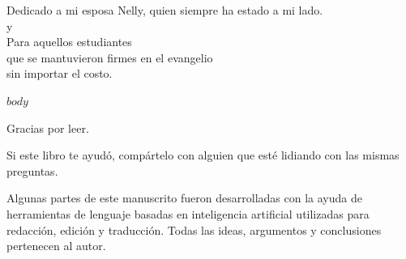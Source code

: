 \documentclass[11.5pt,twoside]{book}
\begin{document}
\vspace*{4cm}

\begin{center}

Dedicado a mi esposa Nelly,
quien siempre ha estado a mi lado.\\

y\\

Para aquellos estudiantes \\
que se mantuvieron firmes en el evangelio\\
sin importar el costo.
\end{center}

\clearpage

\renewcommand{\contentsname}{Índice}
\tableofcontents

\clearpage

$body$

\clearpage
\thispagestyle{empty}

\vspace*{4cm}

\begin{center}

Gracias por leer.

\vspace{1cm}

Si este libro te ayudó, compártelo 
con alguien que esté lidiando con las mismas preguntas.\\

\vspace{1cm}

{\footnotesize
Algunas partes de este manuscrito fueron desarrolladas con la ayuda de herramientas
de lenguaje basadas en inteligencia artificial utilizadas para redacción, edición y
traducción. Todas las ideas, argumentos y conclusiones pertenecen al autor.
}

\end{center}
\end{document}
